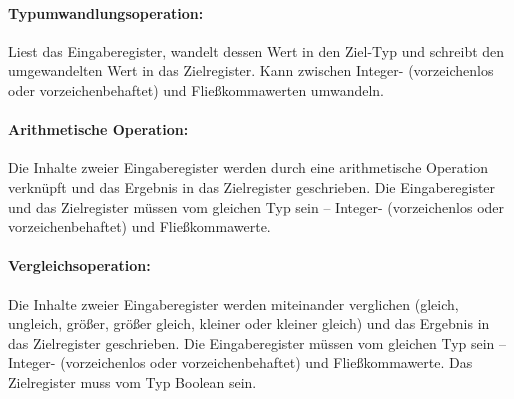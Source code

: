 \documentclass[twoside,a4paper,fleqn,12pt]{book}
\begin{document}


\paragraph{Typumwandlungsoperation:} Liest das Eingaberegister, wandelt dessen Wert in den Ziel-Typ und schreibt den umgewandelten Wert in das Zielregister.
Kann zwischen Integer- (vorzeichenlos oder vorzeichenbehaftet) und Fließkommawerten umwandeln.



\paragraph{Arithmetische Operation:} Die Inhalte zweier Eingaberegister 
werden durch eine arithmetische Operation verknüpft und das Ergebnis in das Zielregister geschrieben.
Die Eingaberegister und das Zielregister müssen vom gleichen Typ sein -- Integer- (vorzeichenlos oder vorzeichenbehaftet) und Fließkommawerte.



\paragraph{Vergleichsoperation:} Die Inhalte zweier Eingaberegister 
werden miteinander verglichen (gleich, ungleich, größer, größer gleich, kleiner oder kleiner gleich) und das Ergebnis in das Zielregister geschrieben.
Die Eingaberegister müssen vom gleichen Typ sein -- Integer- (vorzeichenlos oder vorzeichenbehaftet) und Fließkommawerte.
Das Zielregister muss vom Typ Boolean sein.
\end{document}
